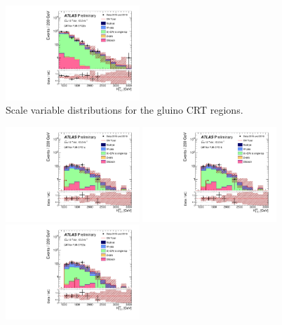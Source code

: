 \begin{figure}[tbph]
\begin{center}
\includegraphics[width=0.45\textwidth]{figures/ATLAS-CONF-2016-078_INT/N-1Plots/AtlasStyle/Preliminary/CRT_SRJigsawSRG3b_LastCut_CRT_minusone}
\end{center}
\caption{Scale variable distributions for the gluino CRT regions.}
\label{fig:CRT_SRJigsawSRG1a_LastCut_CRT_minusone}
\end{figure}

\begin{figure}[tbph]
\begin{center}
\includegraphics[width=0.45\textwidth]{figures/ATLAS-CONF-2016-078_INT/N-1Plots/AtlasStyle/Preliminary/CRT_SRJigsawSRS1a_LastCut_CRT_minusone}
\includegraphics[width=0.45\textwidth]{figures/ATLAS-CONF-2016-078_INT/N-1Plots/AtlasStyle/Preliminary/CRT_SRJigsawSRS1b_LastCut_CRT_minusone}
\includegraphics[width=0.45\textwidth]{figures/ATLAS-CONF-2016-078_INT/N-1Plots/AtlasStyle/Preliminary/CRT_SRJigsawSRS2a_LastCut_CRT_minusone}

\end{center}
\end{figure}
